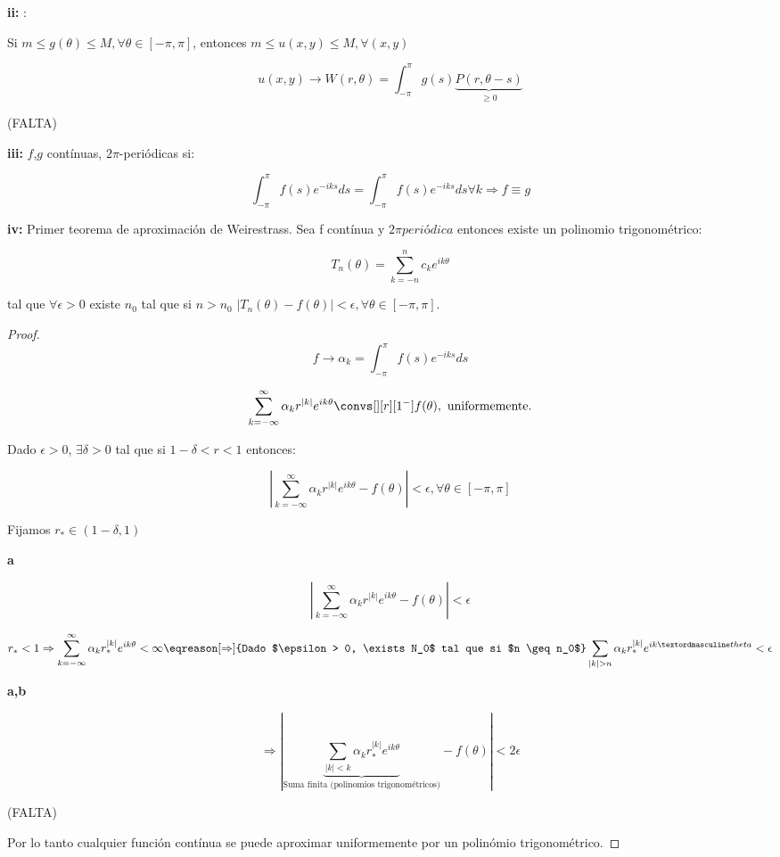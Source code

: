 		\textbf{ii:} :

		Si $m \leq g(\theta) \leq M, \forall \theta \in [-\pi,\pi]$, entonces $m \leq u(x,y) \leq M, \forall (x,y)$

		\[u(x,y) \rightarrow W(r,\theta) = \int_{-\pi}^{\pi} g(s) \underbrace{P(r,\theta-s)}_{\geq 0} \]

		(FALTA)

		\textbf{iii:} $f$,$g$ contínuas, $2\pi$-periódicas si:

		\[ \int_{-\pi}^{\pi} f(s) e^{-iks}ds =
		 \int_{-\pi}^{\pi} f(s) e^{-iks}ds \forall k \Rightarrow f \equiv g \]

		\textbf{iv:} Primer teorema de aproximación de Weirestrass. Sea f contínua y $2\pi periódica$ entonces existe un polinomio trigonométrico:

		\[T_n (\theta) = \sum_{k = -n}^n c_k e^{ik\theta} \]

		tal que $\forall \epsilon > 0$ existe $n_0$ tal que si $n > n_0$ $|T_n (\theta) - f(\theta)| < \epsilon, \forall \theta \in [-\pi,\pi]$.

		\begin{proof}

			\[f \rightarrow \alpha_k = \int_{-\pi}^\pi f(s) e^{-iks} ds  \]

			\[ \sum_{k=-\infty}^{\infty} \alpha_k r^{|k|} e^{ik\theta} \convs[][r][1^-] f(\theta), \text{ uniformemente.} \]

			Dado $\epsilon > 0$, $\exists \delta > 0$ tal que si $1-\delta < r < 1$ entonces:

			\[ \left| \sum_{k=-\infty}^{\infty} \alpha_k r^{|k|} e^{ik\theta} - f(\theta) \right| < \epsilon, \forall \theta \in [-\pi,\pi]  \]

			Fijamos $r_{*} \in (1-\delta, 1)$

			\textbf{a}

			\[ \left| \sum_{k=-\infty}^{\infty} \alpha_k r^{|k|} e^{ik\theta} - f(\theta) \right| < \epsilon \]

			\[  r_* < 1 \Rightarrow \sum_{k=-\infty}^\infty \alpha_k r_*^{|k|} e^{ik\theta} < \infty \eqreason[\Rightarrow]{Dado $\epsilon > 0, \exists N_0$ tal que si $n \geq n_0$} \sum_{|k| > n} \alpha_k r_*^{|k|} e^{ikºtheta} < \epsilon \]

			\textbf{a,b}

			\[ \Rightarrow  \left| \underbrace{\sum_{|k| < k} \alpha_k r_*^{|k|} e^{ik\theta}}_{\text{Suma finita (polinomios trigonométricos)}} - f(\theta) \right| < 2 \epsilon \]

			(FALTA)

			Por lo tanto cualquier función contínua se puede aproximar uniformemente por un polinómio trigonométrico.

		\end{proof}


